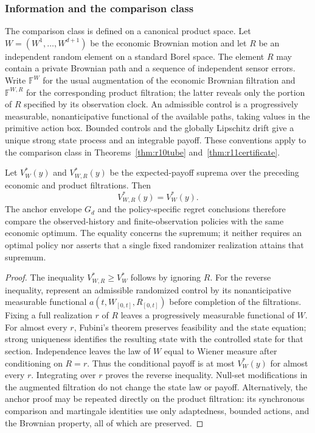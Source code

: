 \subsubsection{Information and the comparison class}\label{sec:r14filtration}
The comparison class is defined on a canonical product space. Let
$W=(W^1,\ldots,W^{d+1})$ be the economic Brownian motion and let $R$ be
an independent random element on a standard Borel space. The element $R$
may contain a private Brownian path and a sequence of independent sensor
errors. Write $\mathbb F^W$ for the usual augmentation of the economic
Brownian filtration and $\mathbb F^{W,R}$ for the corresponding product
filtration; the latter reveals only the portion of $R$ specified by its
observation clock. An admissible control is a progressively measurable,
nonanticipative functional of the available paths, taking values in the
primitive action box. Bounded controls and the globally Lipschitz drift
give a unique strong state process and an integrable payoff. These
conventions apply to the comparison class in
Theorems~\ref{thm:r10tube} and~\ref{thm:r11certificate}.

\begin{proposition}
\label{prop:r14randomization}
Let $V_W^*(y)$ and $V_{W,R}^*(y)$ be the expected-payoff suprema over the
preceding economic and product filtrations. Then
\[
                 V_{W,R}^*(y)=V_W^*(y).
\]
The anchor envelope $G_d$ and the policy-specific regret conclusions
therefore compare the observed-history and finite-observation policies
with the same economic optimum. The equality concerns the supremum;
it neither requires an optimal policy nor asserts that a single fixed
randomizer realization attains that supremum.
\end{proposition}

\begin{proof}
The inequality $V_{W,R}^*\geq V_W^*$ follows by ignoring $R$. For the
reverse inequality, represent an admissible randomized control by its
nonanticipative measurable functional $a(t,W_{[0,t]},R_{[0,t]})$ before
completion of the filtrations. Fixing a full realization $r$ of $R$
leaves a progressively measurable functional of $W$. For almost every
$r$, Fubini's theorem preserves feasibility and the state equation;
strong uniqueness identifies the resulting state with the controlled
state for that section. Independence leaves the law of $W$ equal to
Wiener measure after conditioning on $R=r$. Thus the conditional payoff
is at most $V_W^*(y)$ for almost every $r$. Integrating over $r$ proves
the reverse inequality. Null-set modifications in the augmented
filtration do not change the state law or payoff. Alternatively, the
anchor proof may be repeated directly on the product filtration: its
synchronous comparison and martingale identities use only adaptedness,
bounded actions, and the Brownian property, all of which are preserved.
\end{proof}

